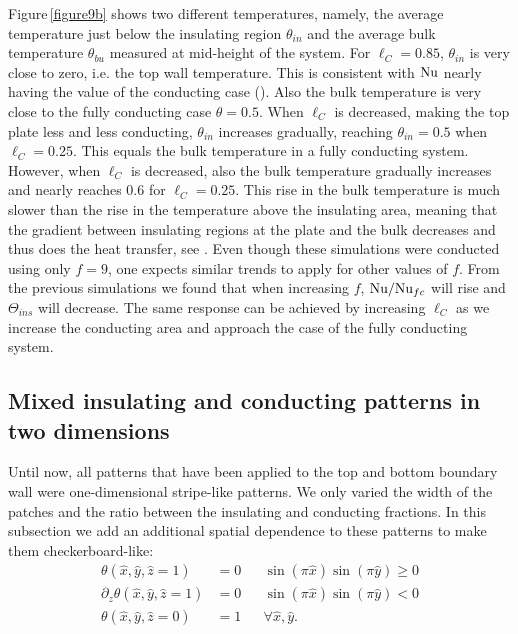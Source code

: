 Figure\,\ref{figure9b} shows two different temperatures, namely, the average
temperature just below the insulating region $\theta_{in}$ and the average
bulk temperature $\theta_{bu}$ measured at mid-height of the system.  For
$\ell_C=0.85$, $\theta_{in}$ is very close to zero, i.e. the top wall
temperature.  This is consistent with $\text{Nu}$ nearly having the value of the
conducting case ().  Also the bulk temperature is very
close to the fully conducting case $\theta=0.5$.  When $\ell_C$ is decreased,
making the top plate less and less conducting, $\theta_{in}$ increases
gradually, reaching $\theta_{in}=0.5$ when $\ell_C=0.25$.  This equals the
bulk temperature in a fully conducting system.  However, when $\ell_C$ is
decreased, also the bulk temperature gradually increases and nearly reaches
0.6 for $\ell_C=0.25$.  This rise in the bulk temperature is much slower than
the rise in the temperature above the insulating area, meaning that the
gradient between insulating regions at the plate and the bulk decreases and
thus does the heat transfer, see .  Even though these
simulations were conducted using only $f=9$, one expects similar trends to
apply for other values of $f$.  From the previous simulations we found that
when increasing $f$, $\text{Nu}/\text{Nu}_{fc}$ will rise and $\Theta_{ins}$ will
decrease.  The same response can be achieved by increasing $\ell_C$ as we
increase the conducting area and approach the case of the fully conducting
system.

%
\subsection{Mixed insulating and conducting patterns in two
dimensions}\label{mixedTwoDimensions} Until now, all patterns that have been
applied to the top and bottom boundary wall were one-dimensional stripe-like
patterns.  We only varied the width of the patches and the ratio between the
insulating and conducting fractions.  In this subsection we add an additional
spatial dependence to these patterns to make them checkerboard-like:
%
\begin{equation}
\begin{aligned}
\theta(\hat{x},\hat{y},\hat{z}=1) &= 0 &&
\sin(\pi\hat x) \sin(\pi\hat y) \geq 0 \\ 
%
\partial_z
\theta(\hat{x},\hat{y},\hat{z}=1) &= 0 &&
\sin(\pi\hat x) \sin(\pi\hat y) < 0 \\ 
%    
\theta(\hat{x},\hat{y},\hat{z}=0) &= 1 &&
\forall \hat{x},\hat{y}.
\end{aligned} \label{eq:boundaryConditions2d}
\end{equation}

